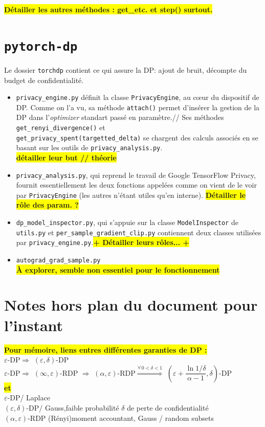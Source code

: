 \documentclass[a4paper,11pt]{article} %
\newcommand{\ttt}[1]{\texttt{#1}}
\newcommand{\rem}[1]{\colorbox{yellow}{\textbf{#1}}}
\begin{document}
\rem{Détailler les autres méthodes : get\_etc. et step() surtout.}
\section{\texttt{pytorch-dp}}
Le dossier \ttt{torchdp} contient ce qui assure  la DP: ajout de bruit, décompte du budget de confidentialité.
\begin{itemize}
	\item
	\ttt{privacy\_engine.py} définit la classe \ttt{PrivacyEngine}, au cœur du dispositif de DP. Comme on l'a vu, sa méthode \ttt{attach()} permet d'insérer la gestion de la DP dans l'\emph{optimizer} standart passé en paramètre.//
    Ses méthodes \ttt{get\_renyi\_divergence()} et\\ \ttt{get\_privacy\_spent(targetted\_delta)} se chargent des calculs associés en se basant sur les outils de \ttt{privacy\_analysis.py}.\\\rem{détailler leur but // théorie}
	\item
    \ttt{privacy\_analysis.py}, qui reprend le travail de Google TensorFlow Privacy, fournit essentiellement les deux fonctions appelées comme on vient de le voir par \ttt{PrivacyEngine} (les autres n'étant utiles qu'en interne). \rem{Détailler le rôle des param. ?}
    \item
    \ttt{dp\_model\_inspector.py}, qui s'appuie sur la classe \ttt{ModelInspector} de \ttt{utils.py}  et \ttt{per\_sample\_gradient\_clip.py} contiennent deux classes utilisées par \ttt{privacy\_engine.py}.\rem{+ Détailler leurs rôles... +}
    \item
    \ttt{autograd\_grad\_sample.py}\\\rem{À explorer, semble non essentiel pour le fonctionnement}
\end{itemize}
\pagebreak
\section{Notes hors plan du document pour l'instant}
\rem{Pour mémoire, liens entres différentes garanties de DP :}\\
$\varepsilon$-DP\quad $\Rightarrow$ \quad $(\varepsilon, \delta)$-DP\\
$\varepsilon$-DP\quad $\Rightarrow$ \quad
  $(\infty, \varepsilon)$-RDP \quad $\Rightarrow$ \quad
  $(\alpha, \varepsilon)$-RDP\quad $\stackrel{\forall\,0<\delta<1}{\Longrightarrow}$ \quad
  $\left( \varepsilon + \dfrac{\ln{1/\delta}}{\alpha-1}, \delta \right)$-DP\\
\rem{et}\\
$\varepsilon$-DP\quad / Laplace\\
$(\varepsilon, \delta)$-DP\quad / Gauss,\quad faible probabilité  $\delta$ de perte de confidentialité\\
$(\alpha, \varepsilon)$-RDP (Rényi)\quad moment accountant, Gauss / random subsets
\end{document}
